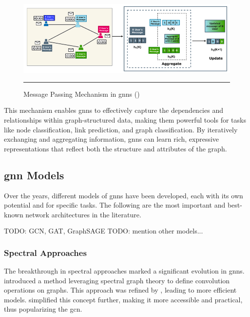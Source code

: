 \begin{figure}[htbp]
    \centering
 \includegraphics[width=.9\textwidth]{03_Figures/literature-review/gnn-message-passing-mechanism.png}
     \rule{35em}{0.5pt}
    \caption{Message Passing Mechanism in \glspl{gnn} (\cite{Khemani2024})} 
 \label{fig:gnn-message-passing-mechanism}
\end{figure}

This mechanism enables \glspl{gnn} to effectively capture the dependencies and relationships within graph-structured data, making them powerful tools for tasks like node classification, link prediction, and graph classification.
By iteratively exchanging and aggregating information, \glspl{gnn} can learn rich, expressive representations that reflect both the structure and attributes of the graph.

\subsection*{\gls{gnn} Models}
Over the years, different models of \glspl{gnn} have been developed, each with its own potential and for specific tasks.
The following are the most important and best-known network architectures in the literature.

TODO: GCN, GAT, GraphSAGE
TODO: mention other models...

\subsubsection*{Spectral Approaches}

The breakthrough in spectral approaches marked a significant evolution in \glspl{gnn}. \cite{Bruna2013} introduced a method leveraging spectral graph theory to define convolution operations on graphs. This approach was refined by \cite{Defferrard2016}, leading to more efficient models. \cite{Kipf2017} simplified this concept further, making it more accessible and practical, thus popularizing the \gls{gcn}.

\subsubsection*{}

